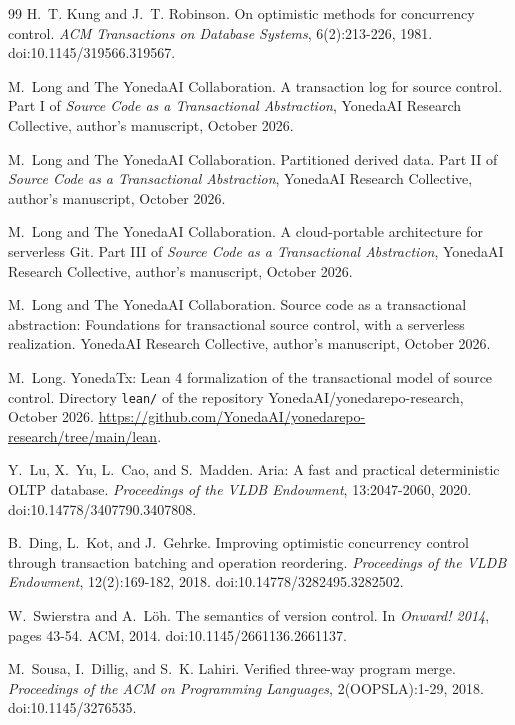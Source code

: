 \documentclass[11pt,letterpaper]{article}
\theoremstyle{definition}
\theoremstyle{remark}
\begin{document}
\begin{thebibliography}{99}
H.~T. Kung and J.~T. Robinson.
On optimistic methods for concurrency control.
\emph{ACM Transactions on Database Systems}, 6(2):213-226, 1981.
doi:10.1145/319566.319567.

M.~Long and The YonedaAI Collaboration.
A transaction log for source control.
Part I of \emph{Source Code as a Transactional Abstraction}, YonedaAI Research Collective, author's manuscript, October 2026.

M.~Long and The YonedaAI Collaboration.
Partitioned derived data.
Part II of \emph{Source Code as a Transactional Abstraction}, YonedaAI Research Collective, author's manuscript, October 2026.

M.~Long and The YonedaAI Collaboration.
A cloud-portable architecture for serverless Git.
Part III of \emph{Source Code as a Transactional Abstraction}, YonedaAI Research Collective, author's manuscript, October 2026.

M.~Long and The YonedaAI Collaboration.
Source code as a transactional abstraction: Foundations for transactional source control, with a serverless realization.
YonedaAI Research Collective, author's manuscript, October 2026.

M.~Long.
YonedaTx: Lean 4 formalization of the transactional model of source control.
Directory \texttt{lean/} of the repository YonedaAI/yonedarepo-research, October 2026.
\url{https://github.com/YonedaAI/yonedarepo-research/tree/main/lean}.

Y.~Lu, X.~Yu, L.~Cao, and S.~Madden.
\newblock Aria: A fast and practical deterministic {OLTP} database.
\newblock \emph{Proceedings of the VLDB Endowment}, 13:2047-2060, 2020.
\newblock doi:10.14778/3407790.3407808.

B.~Ding, L.~Kot, and J.~Gehrke.
\newblock Improving optimistic concurrency control through transaction batching and operation reordering.
\newblock \emph{Proceedings of the VLDB Endowment}, 12(2):169-182, 2018.
\newblock doi:10.14778/3282495.3282502.

W.~Swierstra and A.~L\"oh.
\newblock The semantics of version control.
\newblock In \emph{Onward! 2014}, pages 43-54. ACM, 2014.
\newblock doi:10.1145/2661136.2661137.

M.~Sousa, I.~Dillig, and S.~K. Lahiri.
\newblock Verified three-way program merge.
\newblock \emph{Proceedings of the ACM on Programming Languages}, 2(OOPSLA):1-29, 2018.
\newblock doi:10.1145/3276535.


\end{thebibliography}
\end{document}
